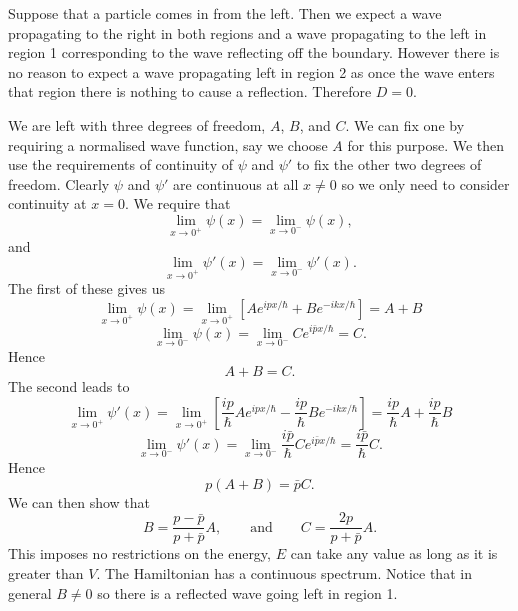     Suppose that a particle comes in from the left.
    Then we expect a wave propagating to the right in both regions and a wave propagating to the left in region 1 corresponding to the wave reflecting off the boundary.
    However there is no reason to expect a wave propagating left in region 2 as once the wave enters that region there is nothing to cause a reflection.
    Therefore \(D = 0\).
    
    We are left with three degrees of freedom, \(A\), \(B\), and \(C\).
    We can fix one by requiring a normalised wave function, say we choose \(A\) for this purpose.
    We then use the requirements of continuity of \(\psi\) and \(\psi'\) to fix the other two degrees of freedom.
    Clearly \(\psi\) and \(\psi'\) are continuous at all \(x \ne 0\) so we only need to consider continuity at \(x = 0\).
    We require that
    \[\lim_{x\to0^+}\psi(x) = \lim_{x\to0^-}\psi(x),\]
    and
    \[\lim_{x\to0^+}\psi'(x) = \lim_{x\to0^-}\psi'(x).\]
    The first of these gives us
    \[\lim_{x\to0^+}\psi(x) = \lim_{x\to0^+}\left[Ae^{ipx/\hbar} + Be^{-ikx/\hbar}\right] = A + B\]
    \[\lim_{x\to0^-}\psi(x) = \lim_{x\to0^-} Ce^{i\bar{p}x/\hbar} = C.\]
    Hence
    \[A + B = C.\]
    The second leads to 
    \[\lim_{x\to0^+}\psi'(x) = \lim_{x\to0^+}\left[\frac{ip}{\hbar}Ae^{ipx/\hbar} - \frac{ip}{\hbar}Be^{-ikx/\hbar}\right] = \frac{ip}{\hbar}A + \frac{ip}{\hbar}B\]
    \[\lim_{x\to0^-}\psi'(x) = \lim_{x\to0^-} \frac{i\bar{p}}{\hbar}Ce^{i\bar{p}x/\hbar} = \frac{i\bar{p}}{\hbar}C.\]
    Hence
    \[p(A + B) = \bar{p}C.\]
    We can then show that
    \[B = \frac{p - \bar{p}}{p + \bar{p}}A,\qquad\text{and}\qquad C = \frac{2p}{p + \bar{p}}A.\]
    This imposes no restrictions on the energy, \(E\) can take any value as long as it is greater than \(V\).
    The Hamiltonian has a continuous spectrum.
    Notice that in general \(B \ne 0\) so there is a reflected wave going left in region 1.
    
